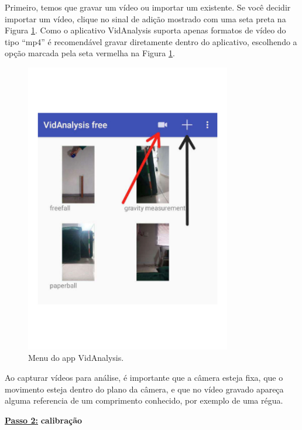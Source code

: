 \documentclass[12pt]{article}
\begin{document}
Primeiro, temos que gravar um vídeo ou importar um existente. Se você decidir importar um vídeo, clique no sinal de adição mostrado com uma seta preta na Figura \ref{apendice1c}. Como o aplicativo VidAnalysis suporta apenas formatos de vídeo do tipo ``mp4'' é recomendável gravar  diretamente dentro do aplicativo, escolhendo a opção marcada pela seta vermelha na Figura \ref{apendice1c}.
\begin{figure}[h!]
\includegraphics[width=9cm]{imagenapendicec1.pdf}
\caption{Menu do app VidAnalysis.}
\label{apendice1c}
\end{figure}
Ao capturar vídeos para análise, é importante que a câmera esteja fixa, que o movimento esteja dentro do plano da câmera, e que no vídeo gravado apareça alguma referencia de 
um comprimento conhecido, por exemplo de uma régua. 
\par
\vskip 0.5cm
\underline{\bf Passo 2:} {\bf calibração}\\
\indent
\end{document}
